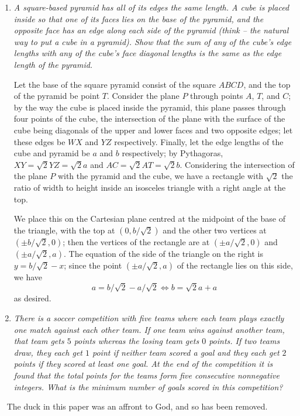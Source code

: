 \documentclass{article}
\begin{document}
\begin{enumerate}[1.]
\item %
{\itshape A square-based pyramid has all of its edges the same length.
A cube is placed inside so that one of its faces lies on the base of the pyramid, and the opposite face has an edge along each side of the pyramid (think -- the natural way to put a cube in a pyramid).
Show that the sum of any of the cube's edge lengths with any of the cube's face diagonal lengths is the same as the edge length of the pyramid.}

Let the base of the square pyramid consist of the square $ABCD$, and the top of the pyramid be point $T$.
Consider the plane $P$ through points $A$, $T$, and $C$; by the way the cube is placed inside the pyramid, this plane passes through four points of the cube, the intersection of the plane with the surface of the cube being diagonals of the upper and lower faces and two opposite edges; let these edges be $WX$ and $YZ$ respectively.
Finally, let the edge lengths of the cube and pyramid be $a$ and $b$ respectively; by Pythagoras, $XY = \sqrt{2} YZ = \sqrt{2} a$ and $AC = \sqrt{2} AT = \sqrt{2} b$.
Considering the intersection of the plane $P$ with the pyramid and the cube, we have a rectangle with $\sqrt{2}$ the ratio of width to height inside an isosceles triangle with a right angle at the top.

We place this on the Cartesian plane centred at the midpoint of the base of the triangle, with the top at $(0,b/\sqrt{2})$ and the other two vertices at $(\pm b/\sqrt{2},0)$; then the vertices of the rectangle are at $(\pm a/\sqrt{2},0)$ and $(\pm a/\sqrt{2},a)$.
The equation of the side of the triangle on the right is $y = b/\sqrt{2} -x$; since the point $(\pm a/\sqrt{2},a)$ of the rectangle lies on this side, we have
\[ a = b/\sqrt{2} -a/\sqrt{2} \iff b = \sqrt{2} a + a \]
as desired.


\item %
{\itshape There is a soccer competition with five teams where each team plays exactly one match against each other team.
If one team wins against another team, that team gets $5$ points whereas the losing team gets $0$ points.
If two teams draw, they each get $1$ point if neither team scored a goal and they each get $2$ points if they scored at least one goal.
At the end of the competition it is found that the total points for the teams form five consecutive nonnegative integers.
What is the minimum number of goals scored in this competition?}

\end{enumerate}


\clearpage
~
\vfill
\centering
The duck in this paper was an affront to God, and so has been removed.
\vfill
\end{document}
